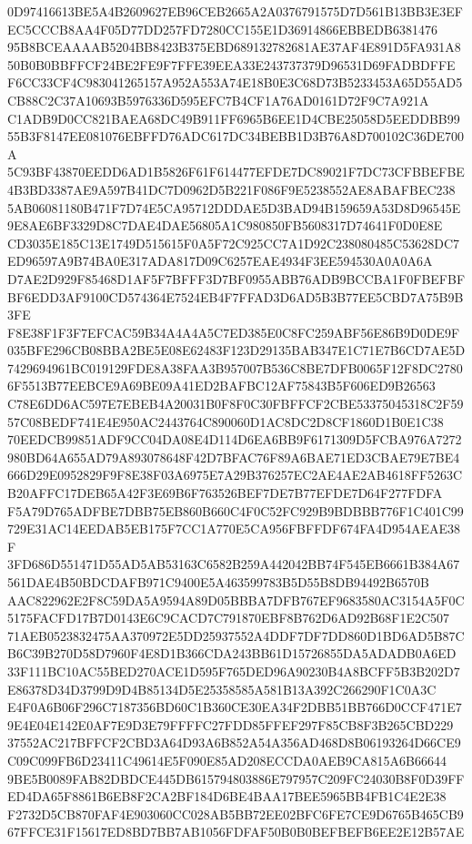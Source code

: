 \documentclass[UTF8,fontset=fandol,zihao=-4,a4paper]{ctexart}
\begin{document}
{{0D97416613BE5A4B2609627EB96CEB2665A2A0376791575D7D561B13BB3E3EFEC5CCCB8AA4F05D77DD257FD7280CC155E1D36914866EBBEDB6381476
95B8BCEAAAAB5204BB8423B375EBD689132782681AE37AF4E891D5FA931A850B0B0BBFFCF24BE2FE9F7FFE39EEA33E243737379D96531D69FADBDFFE
F6CC33CF4C983041265157A952A553A74E18B0E3C68D73B5233453A65D55AD5CB88C2C37A10693B5976336D595EFC7B4CF1A76AD0161D72F9C7A921A
C1ADB9D0CC821BAEA68DC49B911FF6965B6EE1D4CBE25058D5EEDDBB9955B3F8147EE081076EBFFD76ADC617DC34BEBB1D3B76A8D700102C36DE700A
5C93BF43870EEDD6AD1B5826F61F614477EFDE7DC89021F7DC73CFBBEFBE4B3BD3387AE9A597B41DC7D0962D5B221F086F9E5238552AE8ABAFBEC238
5AB06081180B471F7D74E5CA95712DDDAE5D3BAD94B159659A53D8D96545E9E8AE6BF3329D8C7DAE4DAE56805A1C980850FB5608317D74641F0D0E8E
CD3035E185C13E1749D515615F0A5F72C925CC7A1D92C238080485C53628DC7ED96597A9B74BA0E317ADA817D09C6257EAE4934F3EE594530A0A0A6A
D7AE2D929F85468D1AF5F7BFFF3D7BF0955ABB76ADB9BCCBA1F0FBEFBFBF6EDD3AF9100CD574364E7524EB4F7FFAD3D6AD5B3B77EE5CBD7A75B9B3FE
F8E38F1F3F7EFCAC59B34A4A4A5C7ED385E0C8FC259ABF56E86B9D0DE9F035BFE296CB08BBA2BE5E08E62483F123D29135BAB347E1C71E7B6CD7AE5D
7429694961BC019129FDE8A38FAA3B957007B536C8BE7DFB0065F12F8DC27806F5513B77EEBCE9A69BE09A41ED2BAFBC12AF75843B5F606ED9B26563
C78E6DD6AC597E7EBEB4A20031B0F8F0C30FBFFCF2CBE53375045318C2F5957C08BEDF741E4E950AC2443764C890060D1AC8DC2D8CF1860D1B0E1C38
70EEDCB99851ADF9CC04DA08E4D114D6EA6BB9F6171309D5FCBA976A7272980BD64A655AD79A893078648F42D7BFAC76F89A6BAE71ED3CBAE79E7BE4
666D29E0952829F9F8E38F03A6975E7A29B376257EC2AE4AE2AB4618FF5263CB20AFFC17DEB65A42F3E69B6F763526BEF7DE7B77EFDE7D64F277FDFA
F5A79D765ADFBE7DBB75EB860B660C4F0C52FC929B9BDBBB776F1C401C99729E31AC14EEDAB5EB175F7CC1A770E5CA956FBFFDF674FA4D954AEAE38F
3FD686D551471D55AD5AB53163C6582B259A442042BB74F545EB6661B384A67561DAE4B50BDCDAFB971C9400E5A463599783B5D55B8DB94492B6570B
AAC822962E2F8C59DA5A9594A89D05BBBA7DFB767EF9683580AC3154A5F0C5175FACFD17B7D0143E6C9CACD7C791870EBF8B762D6AD92B68F1E2C507
71AEB0523832475AA370972E5DD25937552A4DDF7DF7DD860D1BD6AD5B87CB6C39B270D58D7960F4E8D1B366CDA243BB61D15726855DA5ADADB0A6ED
33F111BC10AC55BED270ACE1D595F765DED96A90230B4A8BCFF5B3B202D7E86378D34D3799D9D4B85134D5E25358585A581B13A392C266290F1C0A3C
E4F0A6B06F296C7187356BD60C1B360CE30EA34F2DBB51BB766D0CCF471E79E4E04E142E0AF7E9D3E79FFFFC27FDD85FFEF297F85CB8F3B265CBD229
37552AC217BFFCF2CBD3A64D93A6B852A54A356AD468D8B06193264D66CE9C09C099FB6D23411C49614E5F090E85AD208ECCDA0AEB9CA815A6B66644
9BE5B0089FAB82DBDCE445DB615794803886E797957C209FC24030B8F0D39FFED4DA65F8861B6EB8F2CA2BF184D6BE4BAA17BEE5965BB4FB1C4E2E38
F2732D5CB870FAF4E903060CC028AB5BB72EE02BFC6FE7CE9D6765B465CB967FFCE31F15617ED8BD7BB7AB1056FDFAF50B0B0BEFBEFB6EE2E12B57AE
}}
\end{document}
